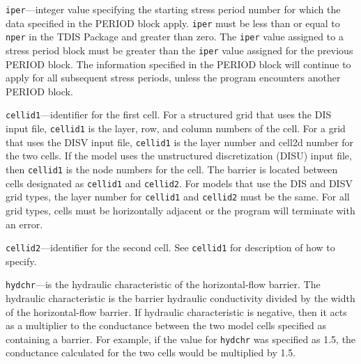 \begin{description}
\item \texttt{iper}---integer value specifying the starting stress period number for which the data specified in the PERIOD block apply.  \texttt{iper} must be less than or equal to \texttt{nper} in the TDIS Package and greater than zero.  The \texttt{iper} value assigned to a stress period block must be greater than the \texttt{iper} value assigned for the previous PERIOD block.  The information specified in the PERIOD block will continue to apply for all subsequent stress periods, unless the program encounters another PERIOD block.

\item \texttt{cellid1}---identifier for the first cell.  For a structured grid that uses the DIS input file, \texttt{cellid1} is the layer, row, and column numbers of the cell.   For a grid that uses the DISV input file, \texttt{cellid1} is the layer number and cell2d number for the two cells.  If the model uses the unstructured discretization (DISU) input file, then \texttt{cellid1} is the node numbers for the cell.  The barrier is located between cells designated as \texttt{cellid1} and \texttt{cellid2}.  For models that use the DIS and DISV grid types, the layer number for \texttt{cellid1} and \texttt{cellid2} must be the same.  For all grid types, cells must be horizontally adjacent or the program will terminate with an error.

\item \texttt{cellid2}---identifier for the second cell. See \texttt{cellid1} for description of how to specify.

\item \texttt{hydchr}---is the hydraulic characteristic of the horizontal-flow barrier. The hydraulic characteristic is the barrier hydraulic conductivity divided by the width of the horizontal-flow barrier. If hydraulic characteristic is negative, then it acts as a multiplier to the conductance between the two model cells specified as containing a barrier. For example, if the value for \texttt{hydchr} was specified as 1.5, the conductance calculated for the two cells would be multiplied by 1.5.

\end{description}


